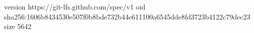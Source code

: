 version https://git-lfs.github.com/spec/v1
oid sha256:1606b8434530e507f0b8bde732b44e611100a6545dde8fd3723b4122c79dec23
size 5642
